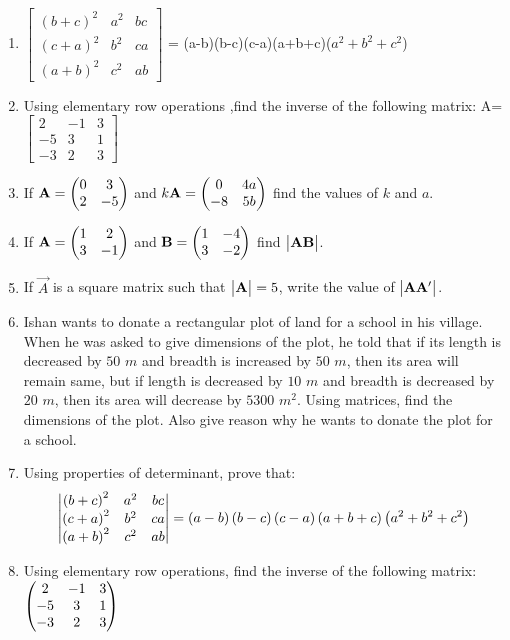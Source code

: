 \begin{enumerate}
    \item $\begin{bmatrix}(b+c)^{2}&a^{2}&bc\\(c+a)^{2}&b^{2}&ca\\(a+b)^{2}&c^{2}&ab \end{bmatrix}$ = (a-b)(b-c)(c-a)(a+b+c)($a^{2}+b^{2}+c^{2}$)
    \item Using elementary row operations ,find the inverse of the following matrix:
          A=$\begin{bmatrix} 2 & -1 & 3 \\-5&3&1\\-3&2&3
              \end{bmatrix}$
    \item If $\mathbf{A} = \begin{pmatrix}0 & 3 \\ 2 & -5\end{pmatrix}$ and $k\mathbf{A} = \begin{pmatrix}0 & 4a \\ -8 & 5b\end{pmatrix}$ find the values of $k$ and $a$.
    \item If $\mathbf{A} = \begin{pmatrix}1 & 2 \\ 3 & -1\end{pmatrix}$ and $\mathbf{B} = \begin{pmatrix}1 & -4 \\ 3 & -2\end{pmatrix}$ find $\begin{vmatrix}\mathbf{A}\mathbf{B}\end{vmatrix}$.
    \item If $\vec{A}$ is a square matrix such that $\begin{vmatrix}\mathbf{A}\end{vmatrix} = 5$, write the value of $\begin{vmatrix}\mathbf{A}\mathbf{A}'\end{vmatrix}$.
    \item Ishan wants to donate a rectangular plot of land for a school in his village. When he was asked to give dimensions of the plot, he told that if its length is decreased by $50$ $m$ and breadth is increased by $50$ $m$, then its area will remain same, but if length is decreased by $10$ $m$ and breadth is decreased by $20$ $m$, then its area will decrease by $5300$ $m^{2}$. Using matrices, find the dimensions of the plot. Also give reason why he wants to donate the plot for a school.
    \item Using properties of determinant, prove that:
\begin{align*}
\begin{vmatrix}\left(b+c\right)^{2} & a^{2} & bc \\ \left(c+a\right)^{2} & b^{2} & ca \\ \left(a+b\right)^{2} & c^{2} & ab\end{vmatrix} = \left(a-b\right)\left(b-c\right)\left(c-a\right)\left(a+b+c\right)\left(a^{2} + b^{2} + c^{2}\right)
\end{align*}
    \item Using elementary row operations, find the inverse of the following matrix: $\begin{pmatrix}2 & -1 & 3 \\ -5 & 3 & 1 \\ -3 & 2 & 3\end{pmatrix}$
\end{enumerate}
